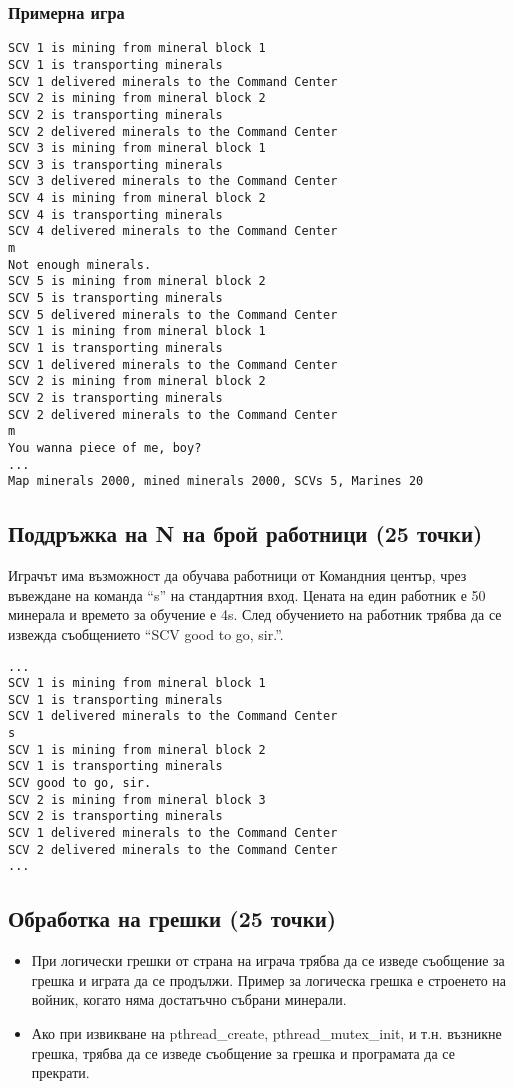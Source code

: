 \documentclass[a4paper,10pt]{article}
\begin{document}
			\subsubsection{Примерна игра}
				\begin{verbatim}
SCV 1 is mining from mineral block 1
SCV 1 is transporting minerals
SCV 1 delivered minerals to the Command Center
SCV 2 is mining from mineral block 2
SCV 2 is transporting minerals
SCV 2 delivered minerals to the Command Center
SCV 3 is mining from mineral block 1
SCV 3 is transporting minerals
SCV 3 delivered minerals to the Command Center
SCV 4 is mining from mineral block 2
SCV 4 is transporting minerals
SCV 4 delivered minerals to the Command Center
m
Not enough minerals.
SCV 5 is mining from mineral block 2
SCV 5 is transporting minerals
SCV 5 delivered minerals to the Command Center
SCV 1 is mining from mineral block 1
SCV 1 is transporting minerals
SCV 1 delivered minerals to the Command Center
SCV 2 is mining from mineral block 2
SCV 2 is transporting minerals
SCV 2 delivered minerals to the Command Center
m
You wanna piece of me, boy?
...
Map minerals 2000, mined minerals 2000, SCVs 5, Marines 20
\end{verbatim}
	
		\subsection{Поддръжка на N на брой работници (25 точки)}
		
			Играчът има възможност да обучава работници от Командния център, чрез въвеждане на команда ``s'' на стандартния вход. Цената на един работник е 50 минерала и времето за обучение е 4s. След обучението на работник трябва да се извежда съобщението ``SCV good to go, sir.''.
			
			\begin{verbatim}
...
SCV 1 is mining from mineral block 1
SCV 1 is transporting minerals 
SCV 1 delivered minerals to the Command Center
s
SCV 1 is mining from mineral block 2
SCV 1 is transporting minerals
SCV good to go, sir.
SCV 2 is mining from mineral block 3
SCV 2 is transporting minerals
SCV 1 delivered minerals to the Command Center
SCV 2 delivered minerals to the Command Center
...
\end{verbatim}
		\subsection{Обработка на грешки (25 точки)}
		\begin{itemize}
			\item При логически грешки от страна на играча трябва да се изведе съобщение за грешка и играта да се продължи. Пример за логическа грешка е строенето на войник, когато няма достатъчно събрани минерали.
			\item Ако при извикване на pthread\_create, pthread\_mutex\_init, и т.н. възникне грешка, трябва да се изведе съобщение за грешка и програмата да се прекрати.
		\end{itemize}
\end{document}
